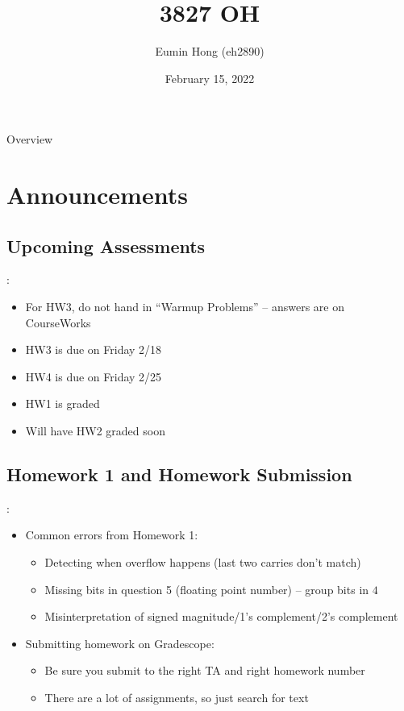 \documentclass{../slides}
\title{3827 OH}
\author{Eumin Hong (eh2890)}
\institute{Columbia University}
\date{February 15, 2022}
\begin{document}
\begin{frame}
    \titlepage
\end{frame}

\begin{frame}{Overview}
\begin{multicols}{2}
\tableofcontents
\end{multicols}
\end{frame}

\section{Announcements}
\subsection{Upcoming Assessments}
\begin{frame}{\secname: \subsecname}
    \begin{itemize}
        \item For HW3, do not hand in \enquote{Warmup Problems} -- answers are on CourseWorks
        \item HW3 is due on Friday 2/18
        \item HW4 is due on Friday 2/25
        \item HW1 is graded
        \item Will have HW2 graded soon
    \end{itemize}
\end{frame}

\subsection{Homework 1 and Homework Submission}
\begin{frame}{\secname: \subsecname}
    \begin{itemize}
        \item Common errors from Homework 1:
        \begin{itemize}
            \item Detecting when overflow happens (last two carries don't match)
            \item Missing bits in question 5 (floating point number) -- group bits in $4$
            \item Misinterpretation of signed magnitude/1's complement/2's complement
        \end{itemize}
        \item Submitting homework on Gradescope:
        \begin{itemize}
            \item Be sure you submit to the right TA and right homework number
            \item There are a lot of assignments, so just search for text
        \end{itemize}
    \end{itemize}
\end{frame}
\end{document}
